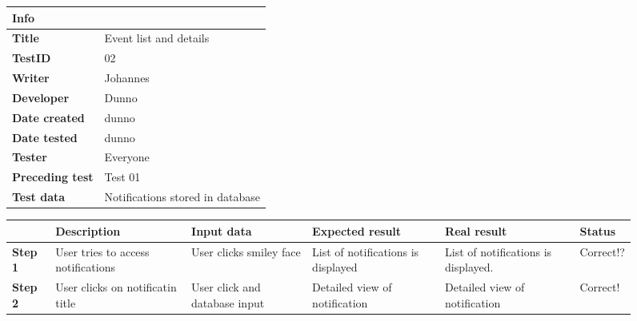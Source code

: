 \begin{figure}
\small

\begin{tabularx}{\textwidth }{|l|X|}
\hline
\cellcolor{blue!25}\textbf{Info} & \cellcolor{blue!25}\\
\hline
\textbf{Title} & Event list and details\\
\hline
\textbf{TestID} & 02\\
\hline
\textbf{Writer}& Johannes\\
\hline
\textbf{Developer}& Dunno\\
\hline
\textbf{Date created}& dunno\\
\hline
\textbf{Date tested}& dunno\\
\hline
\textbf{Tester}& Everyone\\
\hline
\textbf{Preceding test}& Test 01\\
\hline
\textbf{Test data} & Notifications stored in database \\
\hline
\end{tabularx}

\begin{tabularx}{\textwidth}{|X|X|X|X|X|X|}
\hline
\cellcolor{blue!25}&
\cellcolor{blue!25}Description&
\cellcolor{blue!25}Input data&
\cellcolor{blue!25}Expected result&
\cellcolor{blue!25}Real result&
\cellcolor{blue!25}Status\\
\hline
\textbf{Step 1} & User tries to access notifications  & User clicks smiley face & List of notifications is displayed & List of notifications is displayed. & Correct!?\\
\hline
\textbf{Step 2} & User clicks on notificatin title & User click and database input & Detailed view of notification & Detailed view of notification&Correct!\\
\hline
\end{tabularx}
\label{fig:test01}
\end{figure}